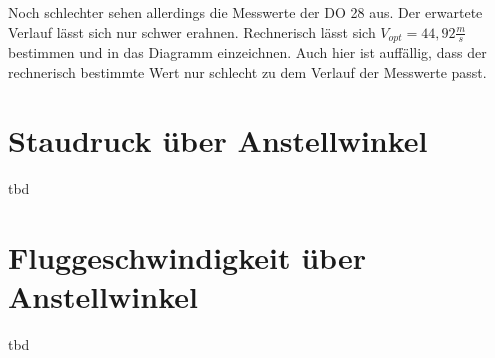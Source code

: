 Noch schlechter sehen allerdings die Messwerte der DO 28 aus. Der erwartete Verlauf lässt sich nur schwer erahnen. Rechnerisch lässt sich $V_{opt} = 44,92 \frac{m}{s}$
bestimmen und in das Diagramm einzeichnen. Auch hier ist auffällig, dass der rechnerisch bestimmte Wert nur schlecht zu dem Verlauf der Messwerte passt.
\section{Staudruck über Anstellwinkel}
tbd

\section{Fluggeschwindigkeit über Anstellwinkel}
tbd